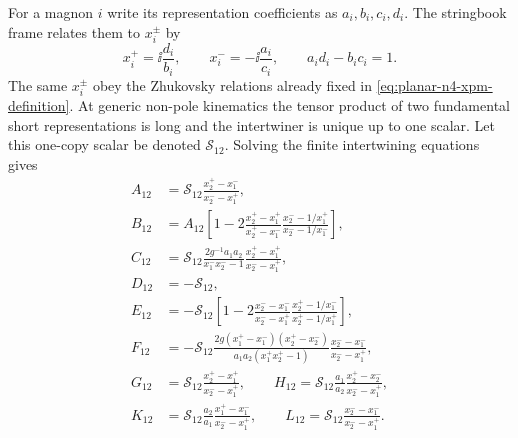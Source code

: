 For a magnon \(i\) write its representation coefficients as
\(a_i,b_i,c_i,d_i\).  The stringbook frame relates them to \(x_i^\pm\) by
\[
  x_i^+=\ii\frac{d_i}{b_i},
  \qquad
  x_i^-=-\ii\frac{a_i}{c_i},
  \qquad
  a_i d_i-b_i c_i=1 .
\]
The same \(x_i^\pm\) obey the Zhukovsky relations already fixed in
\eqref{eq:planar-n4-xpm-definition}.  At generic non-pole kinematics the
tensor product of two fundamental short representations is long and the
intertwiner is unique up to one scalar.  Let this one-copy scalar be denoted
\(\mathcal S_{12}\).  Solving the finite intertwining equations gives
\begin{equation}
\begin{aligned}
  A_{12}
  &=
  \mathcal S_{12}
  \frac{x_2^+-x_1^-}{x_2^- -x_1^+},
  \\
  B_{12}
  &=
  A_{12}\left[
  1
  -2\frac{x_2^+-x_1^+}{x_2^+-x_1^-}
     \frac{x_2^- -1/x_1^+}{x_2^- -1/x_1^-}
  \right],
  \\
  C_{12}
  &=
  \mathcal S_{12}
  \frac{2g^{-1}a_1a_2}{x_1^-x_2^- -1}
  \frac{x_2^+-x_1^+}{x_2^- -x_1^+},
  \\
  D_{12}
  &=-\mathcal S_{12},
  \\
  E_{12}
  &=
  -\mathcal S_{12}\left[
  1
  -2\frac{x_2^- -x_1^-}{x_2^- -x_1^+}
     \frac{x_2^+ -1/x_1^-}{x_2^+ -1/x_1^+}
  \right],
  \\
  F_{12}
  &=
  -\mathcal S_{12}
  \frac{2g(x_1^+-x_1^-)(x_2^+-x_2^-)}
       {a_1a_2(x_1^+x_2^+ -1)}
  \frac{x_2^- -x_1^-}{x_2^- -x_1^+},
  \\
  G_{12}
  &=
  \mathcal S_{12}
  \frac{x_2^+-x_1^+}{x_2^- -x_1^+},
  \qquad
  H_{12}
  =
  \mathcal S_{12}\frac{a_1}{a_2}
  \frac{x_2^+-x_2^-}{x_2^- -x_1^+},
  \\
  K_{12}
  &=
  \mathcal S_{12}\frac{a_2}{a_1}
  \frac{x_1^+-x_1^-}{x_2^- -x_1^+},
  \qquad
  L_{12}
  =
  \mathcal S_{12}
  \frac{x_2^- -x_1^-}{x_2^- -x_1^+}.
\end{aligned}
\label{eq:planar-n4-su2c-ten-amplitudes}
\end{equation}

